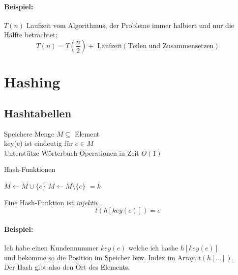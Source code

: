 \documentclass[a4paper]{scrartcl}
\begin{document}
		\paragraph{Beispiel:}
		\( T(n) \) Laufzeit vom Algorithmus, der Probleme immer halbiert und nur die Hälfte betrachtet:
		\[ T(n) = T(\frac{n}{2}) + \text{ Laufzeit} (\text{Teilen und Zusammensetzen}) \]
		
		\subsection{}
		\subsection{}
	
		
\section[Chaos als Ordnungsprinzip]{Hashing}
	
	\subsection{Hashtabellen }
		Speichere Menge \( M \subseteq \) Element\\
		key(e) ist eindeutig für \(e \in M \)\\
		Unterstütze Wörterbuch-Operationen in Zeit \( O(1) \)\\
		\begin{algorithm}[H]
			\caption{Hash-Funktionen}
			\DontPrintSemicolon
			
			 {
				\( M \gets M \cup \{e \} \) \;			
			}
			\BlankLine
			 {
				\(M \gets M \setminus \{e\} \)\;
				 \(= k\) \;
			}
			\BlankLine
		\end{algorithm}
	
		Eine Hash-Funktion ist \emph{injektiv}.\\
		\[ t(h[key(e)])= e \]
		
		\paragraph{Beispiel:}
		Ich habe einen Kundennummer \( key(e) \) welche ich hashe \( h[key(e)] \) \\
		und bekomme so die Position im Speicher bzw. Index im Array. \( t(h[\dots])\). \\
		Der Hash gibt also den Ort des Elements.
		
\end{document}
